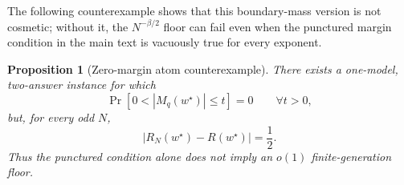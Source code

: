 \documentclass{article} %
\newtheorem{proposition}[theorem]{Proposition}
\providecommand{\Risk}{R}
\providecommand{\wstar}{w^{\star}}
\begin{document}
The following counterexample shows that this boundary-mass version is not cosmetic; without it, the \(N^{-\beta/2}\) floor can fail even when the punctured margin condition in the main text is vacuously true for every exponent.

\begin{proposition}[Zero-margin atom counterexample]
\label{prop:5}
There exists a one-model, two-answer instance for which
\begin{equation}
\label{eq:app4-counter-punctured}
\Pr\!\left[
0<|M_q(\wstar)|\le t
\right]
=
0
\qquad
\forall t>0,
\end{equation}
but, for every odd \(N\),
\begin{equation}
\label{eq:app4-counter-floor}
\left|
R_N(\wstar)-\Risk(\wstar)
\right|
=
\frac{1}{2}.
\end{equation}
Thus the punctured condition alone does not imply an \(o(1)\) finite-generation floor.
\end{proposition}
\end{document}
